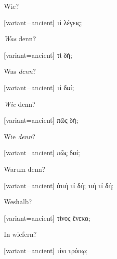 Wie?

\switchcolumn

\begin{greek}[variant=ancient]%
τί λέγεις;

\end{greek}%
\switchcolumn*

\emph{Was} denn?

\switchcolumn

\begin{greek}[variant=ancient]%
τί δή;

\end{greek}%
\switchcolumn*

Was \emph{denn}?

\switchcolumn

\begin{greek}[variant=ancient]%
τί δαί;

\end{greek}%
\switchcolumn*

\emph{Wie} denn?

\switchcolumn

\begin{greek}[variant=ancient]%
πῶς δή;

\end{greek}%
\switchcolumn*

Wie \emph{denn}?

\switchcolumn

\begin{greek}[variant=ancient]%
πῶς δαί;

\end{greek}%
\switchcolumn*

Warum denn?

\switchcolumn

\begin{greek}[variant=ancient]%
ὁτιὴ τί δή; τιὴ τί δή;

\end{greek}%
\switchcolumn*

Wes\textcompwordmark{}halb?

\switchcolumn

\begin{greek}[variant=ancient]%
τίνος ἕνεκα;

\end{greek}%
\switchcolumn*

In wiefern?

\switchcolumn

\begin{greek}[variant=ancient]%
τίνι τρόπῳ;

\end{greek}%
\switchcolumn*

